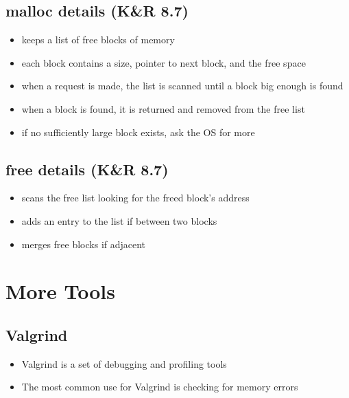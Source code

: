 \documentclass[
]{article}
\providecommand{\tightlist}{%
  \setlength{\itemsep}{0pt}\setlength{\parskip}{0pt}}
\begin{document}
\hypertarget{malloc-details-kr-8.7}{%
\subsection{malloc details (K\&R 8.7)}\label{malloc-details-kr-8.7}}

\begin{itemize}
\tightlist
\item
  keeps a list of free blocks of memory
\item
  each block contains a size, pointer to next block, and the free space
\item
  when a request is made, the list is scanned until a block big enough
  is found
\item
  when a block is found, it is returned and removed from the free list
\item
  if no sufficiently large block exists, ask the OS for more
\end{itemize}

\hypertarget{free-details-kr-8.7}{%
\subsection{free details (K\&R 8.7)}\label{free-details-kr-8.7}}

\begin{itemize}
\tightlist
\item
  scans the free list looking for the freed block's address
\item
  adds an entry to the list if between two blocks
\item
  merges free blocks if adjacent
\end{itemize}

\hypertarget{more-tools}{%
\section{More Tools}\label{more-tools}}

\hypertarget{valgrind}{%
\subsection{Valgrind}\label{valgrind}}

\begin{itemize}
\tightlist
\item
  Valgrind is a set of debugging and profiling tools
\item
  The most common use for Valgrind is checking for memory errors
\end{itemize}
\end{document}

